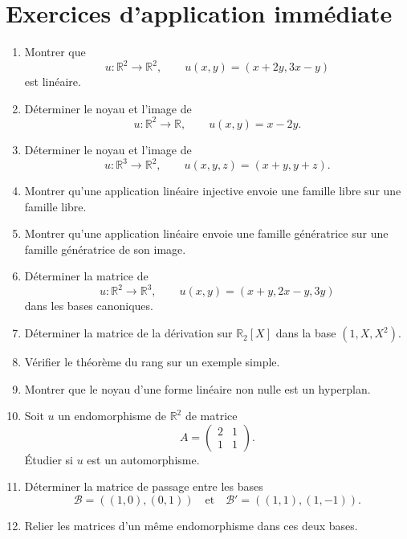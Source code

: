 \documentclass[11pt,a4paper]{article}
\theoremstyle{remark}
\newcommand{\R}{\mathbb{R}}
\begin{document}
\section*{Exercices d’application immédiate}

\begin{enumerate}[label=\textbf{Exercice \arabic*.}]
    \item Montrer que
    \[
    u:\R^2\to\R^2,\qquad u(x,y)=(x+2y,3x-y)
    \]
    est linéaire.

    \item Déterminer le noyau et l’image de
    \[
    u:\R^2\to\R,\qquad u(x,y)=x-2y.
    \]

    \item Déterminer le noyau et l’image de
    \[
    u:\R^3\to\R^2,\qquad u(x,y,z)=(x+y,y+z).
    \]

    \item Montrer qu’une application linéaire injective envoie une famille libre sur une famille libre.

    \item Montrer qu’une application linéaire envoie une famille génératrice sur une famille génératrice de son image.

    \item Déterminer la matrice de
    \[
    u:\R^2\to\R^3,\qquad u(x,y)=(x+y,2x-y,3y)
    \]
    dans les bases canoniques.

    \item Déterminer la matrice de la dérivation sur \(\R_2[X]\) dans la base \((1,X,X^2)\).

    \item Vérifier le théorème du rang sur un exemple simple.

    \item Montrer que le noyau d’une forme linéaire non nulle est un hyperplan.

    \item Soit \(u\) un endomorphisme de \(\R^2\) de matrice
    \[
    A=
    \begin{pmatrix}
    2 & 1\\
    1 & 1
    \end{pmatrix}.
    \]
    Étudier si \(u\) est un automorphisme.

    \item Déterminer la matrice de passage entre les bases
    \[
    \mathcal B=((1,0),(0,1))
    \quad \text{et} \quad
    \mathcal B'=((1,1),(1,-1)).
    \]

    \item Relier les matrices d’un même endomorphisme dans ces deux bases.
\end{enumerate}
\end{document}

